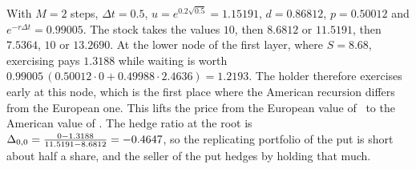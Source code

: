 With $M=2$ steps, $\Delta t=0.5$, $u=e^{0.2\sqrt{0.5}}=1.15191$, $d=0.86812$, $p=0.50012$ and $e^{-r\Delta t}=0.99005$.
The stock takes the values $10$, then $8.6812$ or $11.5191$, then $7.5364$, $10$ or $13.2690$.
At the lower node of the first layer, where $S=8.68$, exercising pays $1.3188$ while waiting is worth $0.99005\,(0.50012\cdot0+0.49988\cdot2.4636)=1.2193$.
The holder therefore exercises early at this node, which is the first place where the American recursion differs from the European one.
This lifts the price from the European value of \TwoStepEu\ to the American value of \TwoStepAm.
The hedge ratio at the root is $\Delta_{0,0}=\frac{0-1.3188}{11.5191-8.6812}=-0.4647$, so the replicating portfolio of the put is short about half a share, and the seller of the put hedges by holding that much.
